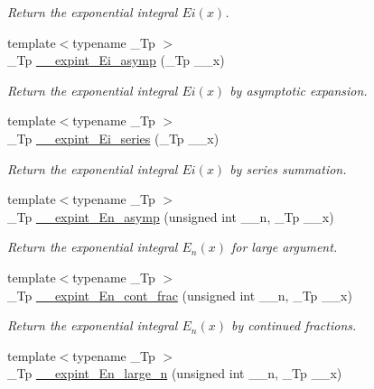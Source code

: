 \begin{DoxyCompactItemize}
\begin{DoxyCompactList}\small\item\em Return the exponential integral $ Ei(x) $. \end{DoxyCompactList}\item 
{\footnotesize template$<$typename \+\_\+\+Tp $>$ }\\\+\_\+\+Tp \hyperlink{namespacestd_1_1____detail_ac272ec880c6d4be02b56089a1cebc46d}{\+\_\+\+\_\+expint\+\_\+\+Ei\+\_\+asymp} (\+\_\+\+Tp \+\_\+\+\_\+x)
\begin{DoxyCompactList}\small\item\em Return the exponential integral $ Ei(x) $ by asymptotic expansion. \end{DoxyCompactList}\item 
{\footnotesize template$<$typename \+\_\+\+Tp $>$ }\\\+\_\+\+Tp \hyperlink{namespacestd_1_1____detail_a7582d1305e84e0263cc6ec2a00a2bf7d}{\+\_\+\+\_\+expint\+\_\+\+Ei\+\_\+series} (\+\_\+\+Tp \+\_\+\+\_\+x)
\begin{DoxyCompactList}\small\item\em Return the exponential integral $ Ei(x) $ by series summation. \end{DoxyCompactList}\item 
{\footnotesize template$<$typename \+\_\+\+Tp $>$ }\\\+\_\+\+Tp \hyperlink{namespacestd_1_1____detail_a3b9f1cc6d66cbd705f52c520eb96b467}{\+\_\+\+\_\+expint\+\_\+\+En\+\_\+asymp} (unsigned int \+\_\+\+\_\+n, \+\_\+\+Tp \+\_\+\+\_\+x)
\begin{DoxyCompactList}\small\item\em Return the exponential integral $ E_n(x) $ for large argument. \end{DoxyCompactList}\item 
{\footnotesize template$<$typename \+\_\+\+Tp $>$ }\\\+\_\+\+Tp \hyperlink{namespacestd_1_1____detail_a34e1eb1248cdad9ceed2aa33732de6ea}{\+\_\+\+\_\+expint\+\_\+\+En\+\_\+cont\+\_\+frac} (unsigned int \+\_\+\+\_\+n, \+\_\+\+Tp \+\_\+\+\_\+x)
\begin{DoxyCompactList}\small\item\em Return the exponential integral $ E_n(x) $ by continued fractions. \end{DoxyCompactList}\item 
{\footnotesize template$<$typename \+\_\+\+Tp $>$ }\\\+\_\+\+Tp \hyperlink{namespacestd_1_1____detail_a77400748c1315de9be10fa5e469df64b}{\+\_\+\+\_\+expint\+\_\+\+En\+\_\+large\+\_\+n} (unsigned int \+\_\+\+\_\+n, \+\_\+\+Tp \+\_\+\+\_\+x)

\end{DoxyCompactItemize}
